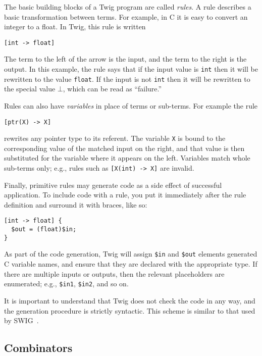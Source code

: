 The basic building blocks of a Twig program are called \emph{rules}. A rule
describes a basic transformation between terms. For example, in C it is easy
to convert an integer to a float. In Twig, this rule is written

\begin{verbatim}
[int -> float]
\end{verbatim}

The term to the left of the arrow is the input, and the term to the right is
the output. In this example, the rule says that if the input value is
\texttt{int} then it will be rewritten to the value \texttt{float}. If the
input is not \texttt{int} then it will be rewritten to the special value
$\bot$, which can be read as ``failure.''

Rules can also have \emph{variables} in place of terms or sub-terms. For
example the rule

\begin{verbatim}
[ptr(X) -> X]
\end{verbatim}

rewrites any pointer type to its referent. The variable \texttt{X} is bound to
the corresponding value of the matched input on the right, and that value is
then substituted for the variable where it appears on the left. Variables
match whole sub-terms only; e.g., rules such as \texttt{[X(int) -> X]} are
invalid.

Finally, primitive rules may generate code as a side effect of successful
application. To include code with a rule, you put it immediately after the
rule definition and surround it with braces, like so:

\begin{verbatim}
[int -> float] {
  $out = (float)$in;
}
\end{verbatim}

As part of the code generation, Twig will assign \texttt{\$in} and
\texttt{\$out} elements generated C variable names, and ensure that they are
declared with the appropriate type. If there are multiple inputs or outputs,
then the relevant placeholders are enumerated; e.g., \texttt{\$in1},
\texttt{\$in2}, and so on.

It is important to understand that Twig does not check the code in any way,
and the generation procedure is strictly syntactic. This scheme is similar to
that used by SWIG~\cite{swig}.

\subsection{Combinators}

